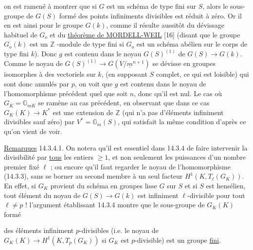
on est ramené à montrer que si $G$ est un schéma de type fini sur $S$, alors le sous-groupe de $G(S)$ formé des points infiniments divisibles est réduit à zéro. Or il en est ainsi pour le groupe $G(k)$, comme il résulte aussitôt du dévissage habituel de $G_o$ et du \underline{théorème de MORDELL-WEIL} [16] (disant que le groupe $G_o(k)$ est un $\mathbb{Z}$ -module de type fini si $G_o$ est un schéma abélien sur le corps de type fini $k$). Donc $g$ est contenu dans le noyau $G(S)^{(1)}$ de $G(S) \longrightarrow G(k)$. Comme le noyau de $G(S)^{(1)} \longrightarrow G(V/\underline{m}^{n+1})$ se dévisse en groupes isomorphes à des vectoriels sur $k$, (en supposant $S$ complet, ce qui est loisible) qui sont donc annulés par $p$, on voit que $g$ est contenu dans le noyau de l'homomorphisme précédent quel que soit $n$, donc qu'il est nul. Le cas où $G_K = \mathbb{G}_{mK}$ se ramène au cas précédent, en observant que dans ce cas $G_K(K) \longrightarrow K^*$ est une extension de $\mathbb{Z}$ (qui n'a pas d'éléments infiniment divisibles sauf zéro) par $V^* = \mathbb{G}_m(S)$, qui satisfait la même condition d'après ce qu'on vient de voir.

\underline{Remarques} 14.3.4.1. On notera qu'il est essentiel dans 14.3.4 de faire intervenir la divisibilité par \underline{tous} les entiers $\geq 1$, et non seulement les puissances d'un nombre premier fixé $\ell$ ; ou encore qu'il faut regarder le noyau de l'homomorphisme (14.3.3), sans se borner au second membre à un seul facteur $H^1(K, T_\ell(G_K))$. En effet, si $G_K$ provient du schéma en groupes lisse $G$ sur $S$ et si $S$ est hensélien, tout élément du noyau de $G(S) \longrightarrow G(k)$ est infiniment $\ell$-divisible pour tout $\ell \neq p$ ! l'argument établissant 14.3.4 montre que le sous-groupe de $G_K(K)$ formé



des éléments infiniment $p$-divisibles (i.e. le noyau de $G_K(K) \to H^1(K,T_p(G_K))$ si $G_K$ est $p$-divisible) est un groupe \underline{fini}.

